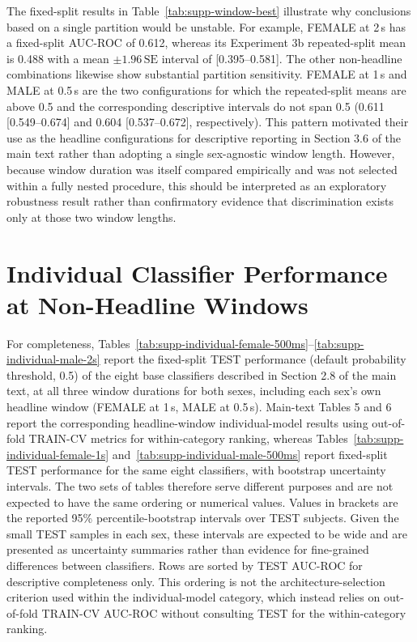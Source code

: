 \documentclass[preprint,12pt]{elsarticle}
\begin{document}
The fixed-split results in Table~\ref{tab:supp-window-best} illustrate why conclusions based on a
single partition would be unstable. For example, FEMALE at 2\,s has a fixed-split AUC-ROC of
0.612, whereas its Experiment 3b repeated-split mean is 0.488 with a mean $\pm1.96\,\mathrm{SE}$
interval of [0.395--0.581]. The other non-headline combinations likewise show substantial
partition sensitivity. FEMALE at 1\,s and MALE at 0.5\,s are the two configurations for which
the repeated-split means are above 0.5 and the corresponding descriptive intervals do not span
0.5 (0.611 [0.549--0.674] and 0.604 [0.537--0.672], respectively). This pattern motivated their
use as the headline configurations for descriptive reporting in Section 3.6 of the main text
rather than adopting a single sex-agnostic window length.
However, because window duration was itself compared empirically and was not selected within a
fully nested procedure, this should be interpreted as an exploratory robustness result rather
than confirmatory evidence that discrimination exists only at those two window lengths.

\section{Individual Classifier Performance at Non-Headline Windows}
\label{sec:supp-individual}

For completeness, Tables~\ref{tab:supp-individual-female-500ms}--\ref{tab:supp-individual-male-2s}
report the fixed-split TEST performance (default probability threshold, 0.5) of the eight base
classifiers described in Section 2.8 of the main text, at all three window durations for both
sexes, including each sex's own headline window (FEMALE at 1\,s, MALE at 0.5\,s). Main-text
Tables 5 and 6 report the corresponding headline-window individual-model results using
out-of-fold TRAIN-CV metrics for within-category ranking, whereas
Tables~\ref{tab:supp-individual-female-1s} and~\ref{tab:supp-individual-male-500ms} report
fixed-split TEST performance for the same eight classifiers, with bootstrap uncertainty
intervals. The two sets of tables therefore serve different purposes and are not expected to have
the same ordering or numerical values. Values in brackets are the reported 95\%
percentile-bootstrap intervals over TEST subjects. Given the small TEST samples in each sex,
these intervals are expected to be wide and are presented as uncertainty summaries rather than
evidence for fine-grained differences between classifiers. Rows are sorted by TEST AUC-ROC for
descriptive completeness only. This ordering is not the architecture-selection criterion used
within the individual-model category, which instead relies on out-of-fold TRAIN-CV AUC-ROC
without consulting TEST for the within-category ranking.
\end{document}
